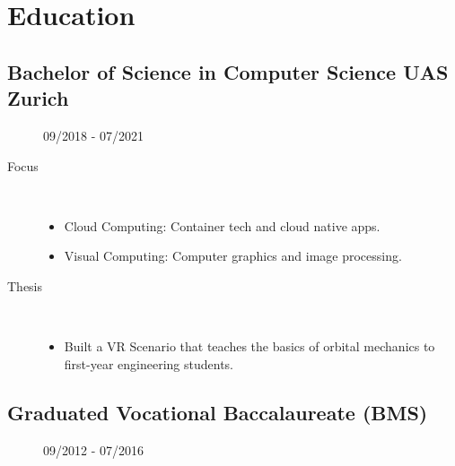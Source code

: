 \section{Education}
\subsection{Bachelor of Science in Computer Science UAS Zurich}
\begin{description}
    \item[\faCalendar] 09/2018 - 07/2021\\
    \item[Focus]~ %
        \begin{itemize}[labelindent=\parindent, leftmargin=*] %
            \item Cloud Computing: Container tech and cloud native apps.
            \item Visual Computing: Computer graphics and image processing.
        \end{itemize}
    \item[Thesis]~ %
        \begin{itemize}[labelindent=\parindent, leftmargin=*]
            \item Built a VR Scenario that teaches the basics of orbital mechanics to first-year engineering students.
        \end{itemize}
\end{description}
\dottedline

\subsection{Graduated Vocational Baccalaureate (BMS)}
\begin{description}
    \item[\faCalendar\color{altColor}] 09/2012 - 07/2016
\end{description}
